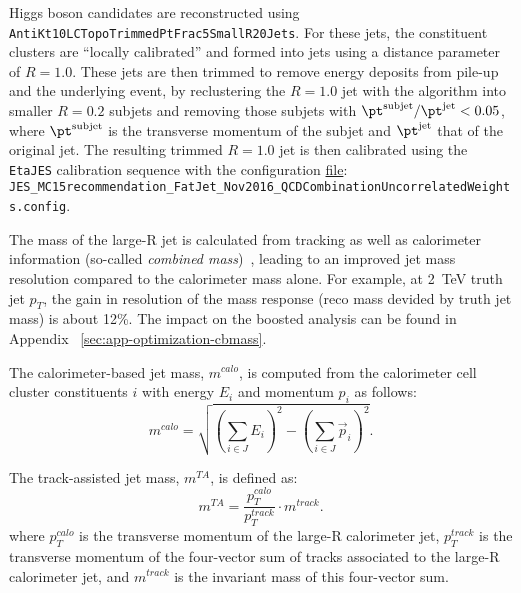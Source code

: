 Higgs boson candidates are reconstructed using \\
 \verb|AntiKt10LCTopoTrimmedPtFrac5SmallR20Jets|. 
 For these jets, the constituent clusters are ``locally calibrated'' \cite{Aad:2011he} and formed into jets using a distance parameter of $R=1.0$. These jets are then trimmed \cite{Krohn2010} to remove energy deposits from pile-up and the underlying event, by reclustering the $R=1.0$ jet with the \kt algorithm into smaller $R=0.2$ subjets and removing those subjets with $\pt^{\rm{subjet}}/\pt^{\rm{jet}} < 0.05$, where $\pt^{\rm{subjet}}$ is the transverse momentum of the subjet and $\pt^{\rm{jet}}$ that of the original jet. The resulting trimmed $R=1.0$ jet is then calibrated using the \verb|EtaJES| calibration sequence with the configuration \href{https://twiki.cern.ch/twiki/bin/view/AtlasProtected/ApplyJetCalibration2016}{file}: \\ \verb|JES_MC15recommendation_FatJet_Nov2016_QCDCombinationUncorrelatedWeights.config|.

The mass of the large-R jet is calculated from tracking as well as calorimeter information (so-called \emph{combined mass})~\cite{ATLAS-CONF-2016-035}, leading to an improved jet mass resolution compared to the calorimeter mass alone. For example, at 2~TeV truth jet $p_T$, the gain in resolution of the mass response (reco mass devided by truth jet mass) is about 12\%. The impact on the boosted analysis can be found in Appendix ~\ref{sec:app-optimization-cbmass}.

The calorimeter-based jet mass, $m^{calo}$, is computed from the calorimeter cell cluster constituents $i$ with energy $E_i$ and momentum $p_i$ as follows:
\begin{equation}
m^{calo} = \sqrt{\left(\sum_{i\in J}E_i\right)^2-\left(\sum_{i\in J}\vec{p}_i\right)^2}.
\end{equation}

The track-assisted jet mass, $m^{TA}$, is defined as:
\begin{equation}
m^{TA} = \frac{p_T^{calo}}{p_T^{track}} \cdot m^{track}.
\end{equation}
where $p_{T}^{calo}$ is the transverse momentum of the large-R calorimeter jet, $p_{T}^{track}$ is the transverse momentum of the four-vector sum of tracks associated to the large-R calorimeter jet, and $m^{track}$ is the invariant mass of this four-vector sum.

